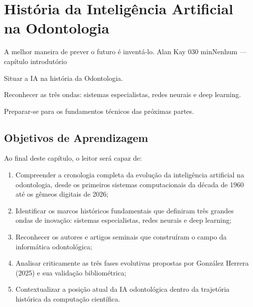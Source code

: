 
\chapter{História da Inteligência Artificial na Odontologia}
\label{cap:historia-ia}

\aberturacap
  {A melhor maneira de prever o futuro é inventá-lo.}
  {Alan Kay}
  {0}{30 min}{Nenhum — capítulo introdutório}
  {\item Situar a IA na história da Odontologia.
   \item Reconhecer as três ondas: sistemas especialistas, redes neurais e deep learning.
   \item Preparar-se para os fundamentos técnicos das próximas partes.}


\section{Objetivos de Aprendizagem}

Ao final deste capítulo, o leitor será capaz de:
\begin{enumerate}
    \item Compreender a cronologia completa da evolução da inteligência artificial na odontologia, desde os primeiros sistemas computacionais da década de 1960 até os gêmeos digitais de 2026;
    \item Identificar os marcos históricos fundamentais que definiram três grandes ondas de inovação: sistemas especialistas, redes neurais e deep learning;
    \item Reconhecer os autores e artigos seminais que construíram o campo da informática odontológica;
    \item Analisar criticamente as três fases evolutivas propostas por González Herrera (2025) e sua validação bibliométrica;
    \item Contextualizar a posição atual da IA odontológica dentro da trajetória histórica da computação científica.
\end{enumerate}


